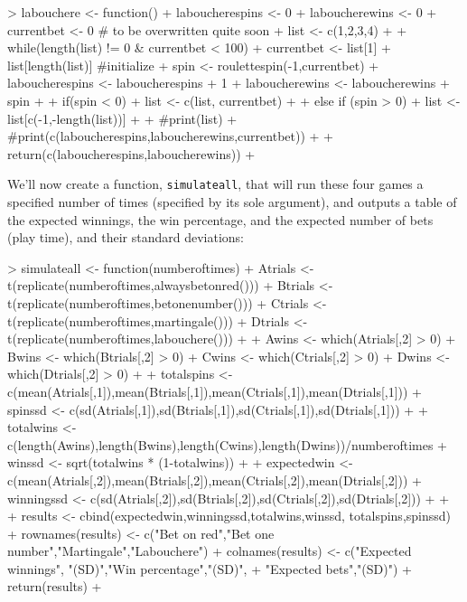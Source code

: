 \documentclass[9pt, oneside, reqno]{article}
\theoremstyle{plain}
\begin{document}
\begin{Schunk}
\begin{Sinput}
> labouchere <- function(){
+ 	laboucherespins <- 0
+ 	laboucherewins <- 0
+ 	currentbet <- 0 # to be overwritten quite soon
+ 	list <- c(1,2,3,4)
+ 	
+ 	while(length(list) != 0 & currentbet < 100){
+ 		currentbet <- list[1] + list[length(list)] #initialize
+ 		spin <- roulettespin(-1,currentbet)
+ 		laboucherespins <- laboucherespins + 1
+ 		laboucherewins <- laboucherewins + spin
+ 		
+ 		if(spin < 0){
+ 			list <- c(list, currentbet)}
+ 			
+ 		else if (spin > 0){
+ 			list <- list[c(-1,-length(list))]}
+ 		
+ 		#print(list)
+ 		#print(c(laboucherespins,laboucherewins,currentbet))
+ 		}
+ 	return(c(laboucherespins,laboucherewins))
+ 	}
\end{Sinput}
\end{Schunk}

We'll now create a function, {\tt simulateall}, that will run these four games a specified number of times (specified by its sole argument), and outputs a table of the expected winnings, the win percentage, and the expected number of bets (play time), and their standard deviations:

\begin{Schunk}
\begin{Sinput}
> simulateall <- function(numberoftimes){
+ 	Atrials <- t(replicate(numberoftimes,alwaysbetonred()))
+ 	Btrials <- t(replicate(numberoftimes,betonenumber()))
+ 	Ctrials <- t(replicate(numberoftimes,martingale()))
+ 	Dtrials <- t(replicate(numberoftimes,labouchere()))
+ 	
+ 	Awins <- which(Atrials[,2] > 0)
+ 	Bwins <- which(Btrials[,2] > 0)
+ 	Cwins <- which(Ctrials[,2] > 0)
+ 	Dwins <- which(Dtrials[,2] > 0)
+ 		
+ 	totalspins <- c(mean(Atrials[,1]),mean(Btrials[,1]),mean(Ctrials[,1]),mean(Dtrials[,1]))
+ 	spinssd <- c(sd(Atrials[,1]),sd(Btrials[,1]),sd(Ctrials[,1]),sd(Dtrials[,1]))
+ 	
+ 	totalwins <- c(length(Awins),length(Bwins),length(Cwins),length(Dwins))/numberoftimes
+ 	winssd <- sqrt(totalwins * (1-totalwins))
+ 		
+ 	expectedwin <- c(mean(Atrials[,2]),mean(Btrials[,2]),mean(Ctrials[,2]),mean(Dtrials[,2]))
+ 	winningssd <- c(sd(Atrials[,2]),sd(Btrials[,2]),sd(Ctrials[,2]),sd(Dtrials[,2]))
+ 	
+ 	
+ 	results <- cbind(expectedwin,winningssd,totalwins,winssd, totalspins,spinssd)
+ 	rownames(results) <- c("Bet on red","Bet one number","Martingale","Labouchere")
+ 	colnames(results) <- c("Expected winnings", "(SD)","Win percentage","(SD)",
+ 	"Expected bets","(SD)")
+ 	return(results)
+ 	}
\end{Sinput}
\end{Schunk}
\end{document}
